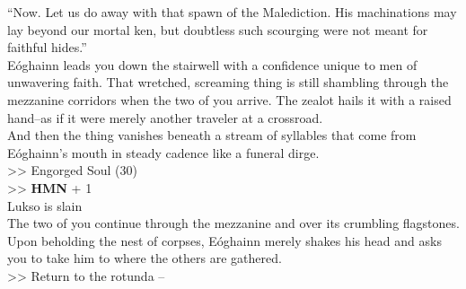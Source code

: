 “Now. Let us do away with that spawn of the Malediction. His machinations may lay beyond our mortal ken, but doubtless such scourging were not meant for faithful hides.”\\

Eóghainn leads you down the stairwell with a confidence unique to men of unwavering faith. That wretched, screaming thing is still shambling through the mezzanine corridors when the two of you arrive. The zealot hails it with a raised hand--as if it were merely another traveler at a crossroad.\\

And then the thing vanishes beneath a stream of syllables that come from Eóghainn’s mouth in steady cadence like a funeral dirge.\\
>> Engorged Soul (30)\\
>> \textbf{HMN} + 1\\
 Lukso is slain\\

The two of you continue through the mezzanine and over its crumbling flagstones. Upon beholding the nest of corpses, Eóghainn merely shakes his head and asks you to take him to where the others are gathered.\\

>> Return to the rotunda -- 